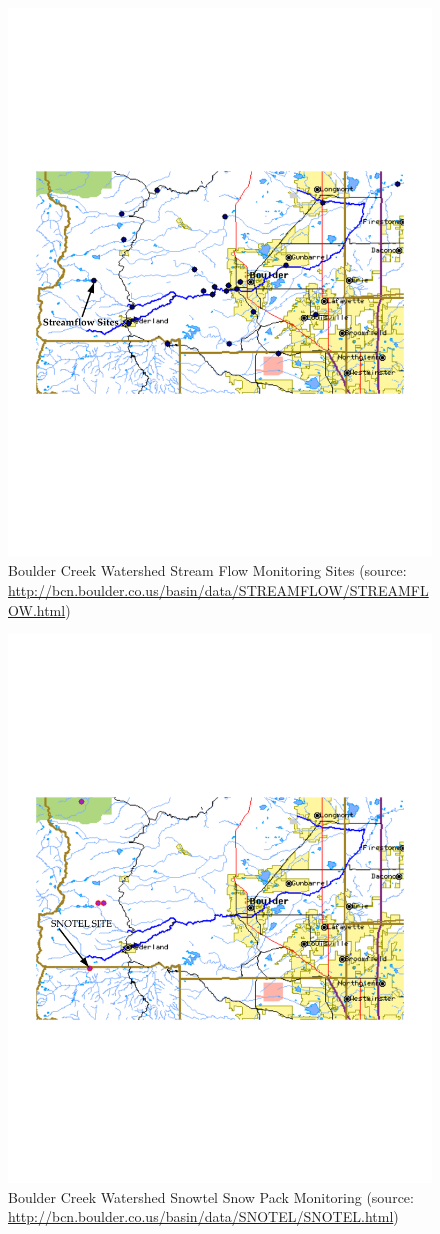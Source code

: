 \documentclass[11pt]{article}
\begin{document}
\begin{figure}[htbp] %
   \centering
   \includegraphics[width=.9\textwidth]{STREAMFLOW.pdf} 
   \caption{Boulder Creek Watershed Stream Flow Monitoring Sites (source: \url{http://bcn.boulder.co.us/basin/data/STREAMFLOW/STREAMFLOW.html})}
\end{figure}

\begin{figure}[htbp] %
   \centering
   \includegraphics[width=.9\textwidth]{SNOTEL.pdf} 
   \caption{Boulder Creek Watershed Snowtel Snow Pack Monitoring (source: \url{http://bcn.boulder.co.us/basin/data/SNOTEL/SNOTEL.html})}
\end{figure}
\end{document}
